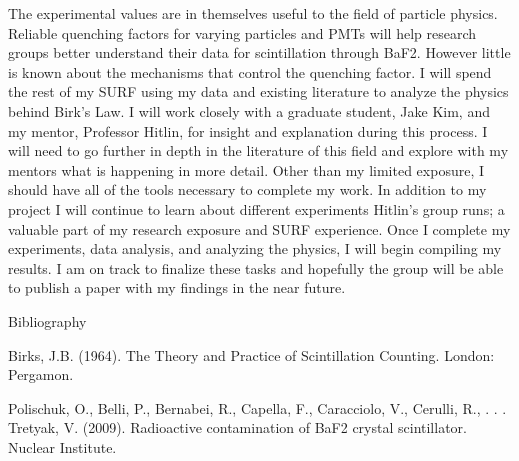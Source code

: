 \documentclass{article}
\begin{document}
The experimental values are in themselves useful to the field of particle physics. Reliable quenching factors for varying particles and PMTs will help research groups better understand their data for scintillation through BaF2. However little is known about the mechanisms that control the quenching factor. I will spend the rest of my SURF using my data and existing literature to analyze the physics behind Birk’s Law. I will work closely with a graduate student, Jake Kim, and my mentor, Professor Hitlin, for insight and explanation during this process. I will need to go further in depth in the literature of this field and explore with my mentors what is happening in more detail. Other than my limited exposure, I should have all of the tools necessary to complete my work. In addition to my project I will continue to learn about different experiments Hitlin’s group runs; a valuable part of my research exposure and SURF experience. Once I complete my experiments, data analysis, and analyzing the physics, I will begin compiling my results. I am on track to finalize these tasks and hopefully the group will be able to publish a paper with my findings in the near future.


\setlength{\parskip}{2em}
\noindent
Bibliography

\noindent
Birks, J.B. (1964). The Theory and Practice of Scintillation Counting. London:
Pergamon.

\noindent
Polischuk, O., Belli, P., Bernabei, R., Capella, F., Caracciolo, V., Cerulli, R., . . . Tretyak, V. (2009). Radioactive contamination of BaF2 crystal scintillator. Nuclear Institute.
\end{document}
